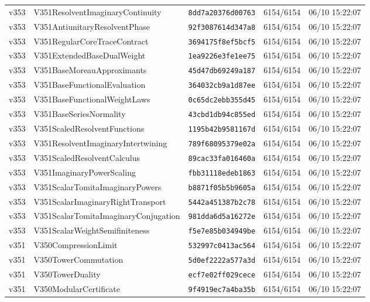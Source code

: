 \documentclass[11pt]{article}
\theoremstyle{definition}\newtheorem{deriv}{Derivação}
\begin{document}
{\begin{longtable}{@{}lllll@{}}
v353 & V351ResolventImaginaryContinuity & \texttt{8dd7a20376d00763} & 6154/6154 & 06/10 15:22:07 \\
v353 & V351AntiunitaryResolventPhase & \texttt{92f3087614d347a8} & 6154/6154 & 06/10 15:22:07 \\
v353 & V351RegularCoreTraceContract & \texttt{3694175f8ef5bcf5} & 6154/6154 & 06/10 15:22:07 \\
v353 & V351ExtendedBaseDualWeight & \texttt{1ea9226e3fe1ee75} & 6154/6154 & 06/10 15:22:07 \\
v353 & V351BaseMoreauApproximants & \texttt{45d47db69249a187} & 6154/6154 & 06/10 15:22:07 \\
v353 & V351BaseFunctionalEvaluation & \texttt{364032cb9a1d87ee} & 6154/6154 & 06/10 15:22:07 \\
v353 & V351BaseFunctionalWeightLaws & \texttt{0c65dc2ebb355d45} & 6154/6154 & 06/10 15:22:07 \\
v353 & V351BaseSeriesNormality & \texttt{43cbd1db94c855ed} & 6154/6154 & 06/10 15:22:07 \\
v353 & V351ScaledResolventFunctions & \texttt{1195b42b9581167d} & 6154/6154 & 06/10 15:22:07 \\
v353 & V351ResolventImaginaryIntertwining & \texttt{789f68095379e02a} & 6154/6154 & 06/10 15:22:07 \\
v353 & V351ScaledResolventCalculus & \texttt{89cac33fa016460a} & 6154/6154 & 06/10 15:22:07 \\
v353 & V351ImaginaryPowerScaling & \texttt{fbb31118edeb1863} & 6154/6154 & 06/10 15:22:07 \\
v353 & V351ScalarTomitaImaginaryPowers & \texttt{b8871f05b5b9605a} & 6154/6154 & 06/10 15:22:07 \\
v353 & V351ScalarImaginaryRightTransport & \texttt{5442a451387b2c78} & 6154/6154 & 06/10 15:22:07 \\
v353 & V351ScalarTomitaImaginaryConjugation & \texttt{981dda6d5a16272e} & 6154/6154 & 06/10 15:22:07 \\
v353 & V351ScalarWeightSemifiniteness & \texttt{f5e7e85b034949be} & 6154/6154 & 06/10 15:22:07 \\
v351 & V350CompressionLimit & \texttt{532997c0413ac564} & 6154/6154 & 06/10 15:22:07 \\
v351 & V350TowerCommutation & \texttt{5d0ef2222a577a3d} & 6154/6154 & 06/10 15:22:07 \\
v351 & V350TowerDuality & \texttt{ecf7e02ff029cece} & 6154/6154 & 06/10 15:22:07 \\
v351 & V350ModularCertificate & \texttt{9f4919ec7a4ba35b} & 6154/6154 & 06/10 15:22:07 \\

\end{longtable}}
\end{document}
